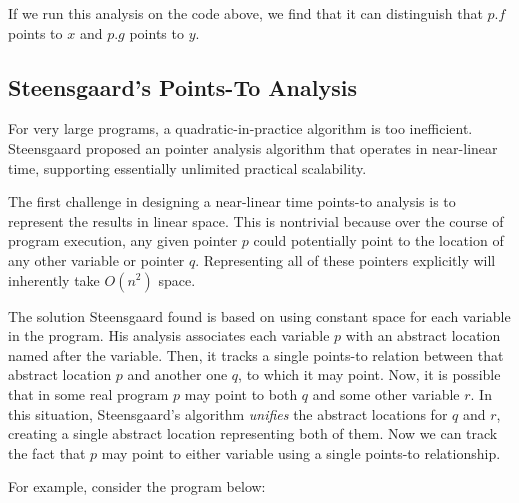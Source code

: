 \documentclass[11pt]{article}
\begin{document}
If we run this analysis on the code above, we find that it can distinguish that
$p.f$ points to $x$ and $p.g$ points to $y$.


\subsection{Steensgaard's Points-To Analysis}

For very large programs, a quadratic-in-practice algorithm is too inefficient.
Steensgaard proposed an pointer analysis algorithm that operates in near-linear
time, supporting essentially unlimited practical scalability.

The first challenge in designing a near-linear time points-to analysis is to
represent the results in linear space. This is nontrivial because over the
course of program execution, any given pointer $p$ could potentially point to
the location of any other variable or pointer $q$. Representing all of these
pointers explicitly will inherently take $O(n^2)$ space.

The solution Steensgaard found is based on using constant space for each
variable in the program. His analysis associates each variable $p$ with an
abstract location named after the variable. Then, it tracks a single points-to
relation between that abstract location $p$ and another one $q$, to which it may
point. Now, it is possible that in some real program $p$ may point to both $q$
and some other variable $r$. In this situation, Steensgaard's algorithm
\textit{unifies} the abstract locations for $q$ and $r$, creating a single
abstract location representing both of them. Now we can track the fact that $p$
may point to either variable using a single points-to relationship.

For example, consider the program below:
\end{document}
